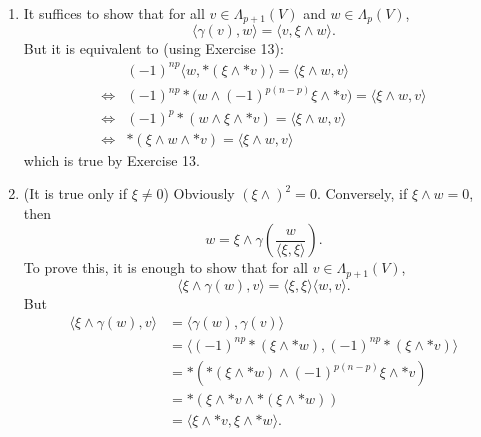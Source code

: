 \begin{enumerate}
(5) Since $* *$ is linear, we only need to show this property for the basis elements. 
If $\Phi=\left\{i_{1}, \ldots, i_{p}\right\} \subset \{1, \ldots, n\}$ 
and let $f$ be the element which satisfies $e_{\Phi} \wedge f=e_{1} \wedge \ldots \wedge e_{n}$, then
\[f \wedge e_{\Phi}=(-1)^{p(n-p)} e_{1} \wedge \ldots \wedge e_{n}.\]
Therefore $* * e_{\Phi}= \pm * f=(-1)^{p(n-p)} e_{\Phi}$.

(6) Since the equation is bilinear in $v$ and $w$, 
we only need to show this for the basis elements. 
Therefore we can assume that $v=e_{\Phi_{1}}, w=e_{\Phi_{2}}$. If $v \neq w$,
\[\langle v, w\rangle=*(w \wedge * v)=*(v \wedge * w)=0\]
by definition of star and inner product. If $v=w$,
\[\langle v, w\rangle=*(w \wedge * v)=*(v \wedge * w)=1\]
also by definition. Hence (6) is proved.
\item It suffices to show that for all $v \in \Lambda_{p+1}(V)$ and $w \in \Lambda_{p}(V)$, 
\[\langle \gamma(v), w\rangle=\langle v, \xi \wedge w\rangle.\]
But it is equivalent to (using Exercise 13):
\begin{align*} 
& (-1)^{np}\langle w, *(\xi \wedge * v)\rangle=\langle\xi \wedge w, v\rangle \\
\Leftrightarrow & (-1)^{np} *\big(w \wedge(-1)^{p(n-p)} \xi \wedge * v\big)=\langle \xi \wedge w, v\rangle \\
\Leftrightarrow & (-1)^{p} *(w \wedge \xi \wedge * v)=\langle\xi \wedge w, v\rangle \\
\Leftrightarrow & *(\xi \wedge w \wedge * v)=\langle\xi \wedge w, v\rangle
\end{align*}
which is true by Exercise 13.
\item (It is true only if $\xi \neq 0$) Obviously $(\xi \wedge)^{2}=0$. 
Conversely, if $\xi \wedge w=0$, then
\[w=\xi \wedge \gamma\left(\frac{w}{\langle\xi, \xi\rangle}\right).\]
To prove this, it is enough to show that for all $v \in \Lambda_{p+1}(V)$,
\[\langle \xi \wedge \gamma(w), v\rangle=\langle \xi, \xi\rangle \langle w, v\rangle.\]
But
\begin{align*}
\langle \xi \wedge \gamma(w), v\rangle&=\langle \gamma(w), \gamma(v)\rangle\\
&=\langle (-1)^{np} *(\xi \wedge * w),(-1)^{np} *(\xi \wedge * v)\rangle\\
&=*(*(\xi \wedge * w) \wedge(-1)^{p(n-p)} \xi \wedge * v)\\
&=*(\xi \wedge * v \wedge *(\xi \wedge * w))\\
&=\langle \xi \wedge * v, \xi \wedge * w\rangle.
\end{align*}

\end{enumerate}
